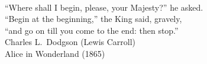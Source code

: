 \documentclass[12pt,a4paper,twoside]{book}
\renewcommand{\thefigure}{{\normalfont\arabic{chapter}\alph{figure}}}
\renewcommand{\thetable}{{\normalfont\arabic{chapter}.\arabic{table}}}
\begin{document}
\frontmatter


\cleardoublepage
{\markboth{}{}
  \pagestyle{empty}
  ~\vspace*{20mm}
  \begin{flushright}
    \fontsize{12}{16}\selectfont
    ``Where shall I begin, please, your Majesty?'' he asked. \\
    ``Begin at the beginning,'' the King said, gravely, \\
    ``and go on till you come to the end: then stop.'' \\[2ex]
    \fontsize{10}{12}\selectfont
    Charles L.\ Dodgson (Lewis Carroll) \\
    Alice in Wonderland (1865) \par
  \end{flushright}}
\cleardoublepage
\mainmatter













\appendix
\renewcommand{\thefigure}{{\normalfont\Alph{chapter}\arabic{figure}}}
\renewcommand{\thetable}{{\normalfont\Alph{chapter}.\arabic{table}}}






%
%
\cleardoublepage
\end{document}
